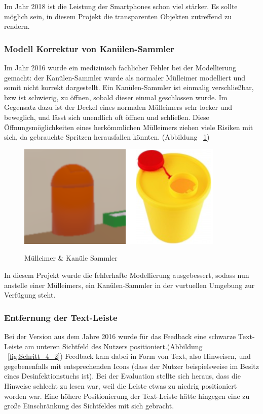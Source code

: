    Im Jahr 2018 ist die Leistung der Smartphones schon viel stärker. Es sollte möglich sein, in diesem Projekt die transparenten Objekten zutreffend zu rendern.
   
   \subsubsection{Modell Korrektur von Kanülen-Sammler}
   Im Jahr 2016 wurde ein medizinisch fachlicher Fehler bei der Modellierung gemacht: der Kanülen-Sammler wurde als normaler Mülleimer modelliert und somit nicht korrekt dargestellt. Ein Kanülen-Sammler ist einmalig verschließbar, bzw ist schwierig, zu öffnen, sobald dieser einmal geschlossen wurde. Im Gegensatz dazu ist der Deckel eines normalen Mülleimers sehr locker und beweglich, und lässt sich unendlich oft öffnen und schließen. Diese Öffnungsmöglichkeiten eines herkömmlichen Mülleimers ziehen viele Risiken mit sich, da gebrauchte Spritzen herausfallen könnten. (Abbildung ~\ref{fig:muelleimerKanueleSammler})

\begin{figure}[ht]
\vspace*{1em}
\centering
\caption{Mülleimer \& Kanüle Sammler}
\includegraphics[width=\textwidth]{images/muelleimerKanueleSammler.png}
\label{fig:muelleimerKanueleSammler} 
\end{figure}

In diesem Projekt wurde die fehlerhafte Modellierung ausgebessert, sodass nun anstelle einer Mülleimers, ein Kanülen-Sammler in der vurtuellen Umgebung zur Verfügung steht.

   \subsubsection{Entfernung der Text-Leiste}
   Bei der Version aus dem Jahre 2016 wurde für das Feedback eine schwarze Text-Leiste am unteren Sichtfeld des Nutzers positioniert.(Abbildung ~\ref{fig:Schritt_4_2}) Feedback kam dabei in Form von Text, also Hinweisen, und gegebenenfalls mit entsprechenden Icons (dass der Nutzer beispielsweise im Besitz eines Desinfektionstuchs ist). Bei der Evaluation stellte sich heraus, dass die Hinweise schlecht zu lesen war, weil die Leiste etwas zu niedrig positioniert worden war. Eine höhere Positionierung der Text-Leiste hätte hingegen eine zu große Einschränkung des Sichtfeldes mit sich gebracht.
   
